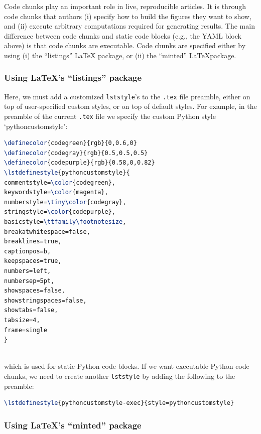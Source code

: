 \documentclass[12pt]{article}
\begin{document}
Code chunks play an important role in live, reproducible articles.
It is through code chunks that authors (i) specify how to build the
figures they want to show, and (ii) execute arbitrary computations
required for generating results.
The main difference between code chunks and static code blocks (e.g.,
the YAML block above) is that code chunks are executable.
Code chunks are specified either by using (i) the ``listings'' \LaTeX
package, or (ii) the ``minted'' \LaTeX package.

\subsubsection*{Using \LaTeX 's ``listings'' package}

Here, we must add a customized \texttt{lststyle}'s to the
\texttt{.tex} file preamble, either on top of user-specified custom
styles, or on top of default styles.
For example, in the preamble of the current \texttt{.tex} file we
specify the custom Python style `pythoncustomstyle':\\

\begin{lstlisting}[language=tex, frame=single]
\definecolor{codegreen}{rgb}{0,0.6,0}
\definecolor{codegray}{rgb}{0.5,0.5,0.5}
\definecolor{codepurple}{rgb}{0.58,0,0.82}
\lstdefinestyle{pythoncustomstyle}{  
commentstyle=\color{codegreen},
keywordstyle=\color{magenta},
numberstyle=\tiny\color{codegray},
stringstyle=\color{codepurple},
basicstyle=\ttfamily\footnotesize,
breakatwhitespace=false,         
breaklines=true,                 
captionpos=b,                    
keepspaces=true,                 
numbers=left,                    
numbersep=5pt,                  
showspaces=false,                
showstringspaces=false,
showtabs=false,                  
tabsize=4,
frame=single
}
\end{lstlisting}

\noindent \\which is used for static Python code blocks.
If we want executable Python code chunks, we need to create another
\texttt{lststyle} by adding the following to the preamble:\\

\begin{lstlisting}[language=tex, frame=single, breaklines=true]
\lstdefinestyle{pythoncustomstyle-exec}{style=pythoncustomstyle}
\end{lstlisting}

\subsubsection*{Using \LaTeX 's ``minted'' package}
\end{document}
